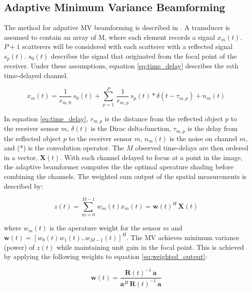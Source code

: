 \documentclass[journal]{IEEEtran}
\begin{document}
\subsection{Adaptive Minimum Variance Beamforming}

The method for adpative MV beamforming is described in \cite{synnevag2007adaptive}. A transducer is assumed to contain an array of M, where each element records a signal $x_m(t)$. $P+1$ scatterers will be considered with each scatterer with a reflected signal $s_p(t)$. $s_0(t)$ describes the signal that originated from the focal point of the receiver. Under these assumptions, equation \ref{eq:time_delay} describes the $m$th time-delayed channel.

    \begin{equation}\label{eq:time_delay}
    x_m(t) = \frac{1}{r_{m,0}} \, s_0(t) + \sum_{p=1}^{P} \, \frac{1}{r_{m,p}} \, s_p(t) * \delta(t - \tau_{m,p}) + n_m(t)
   \end{equation}
   
   In equation \ref{eq:time_delay}, $r_{m,p}$ is the distance from the reflected object $p$ to the receiver sensor $m$, $\delta(t)$ is the Dirac delta-function, $\tau_{m,p}$ is the delay from the reflected object $p$ to the receiver sensor $m$, $n_m(t)$ is the noise on channel $m$, and ($*$) is the convolution operator. The $M$ observed time-delays are then ordered in a vector, $\textbf{X}(t)$. With each channel delayed to focus at a point in the image, the adaptive beamformer computes the the optimal aperature shading before combining the channels. The weighted sum output of the spatial measurements is described by: 
   
    \begin{equation}\label{eq:weighted_output}
    z(t) = \sum_{m=0}^{M-1} \, w_m(t)x_m(t) = \textbf{w}(t)^H \, \textbf{X}(t)
   \end{equation}

    where $w_m(t)$ is the aperature weight for the sensor $m$ and $\textbf{w}(t) = [w_0(t) w_1(t) .. w_{M-1}(t)]^H$. The MV achieves minimum variance (power) of $z(t)$ while maintaining unit gain in the focal point. This is achieved by applying the following weights to equation \ref{eq:weighted_output}:  
    
    \begin{equation}\label{eq:weights}
    \textbf{w}(t) = \frac{\textbf{R}(t)^{-1} \, \textbf{a}}{\textbf{a}^H \, \textbf{R}(t)^{-1} \, \textbf{a}}
   \end{equation}
   
\end{document}
